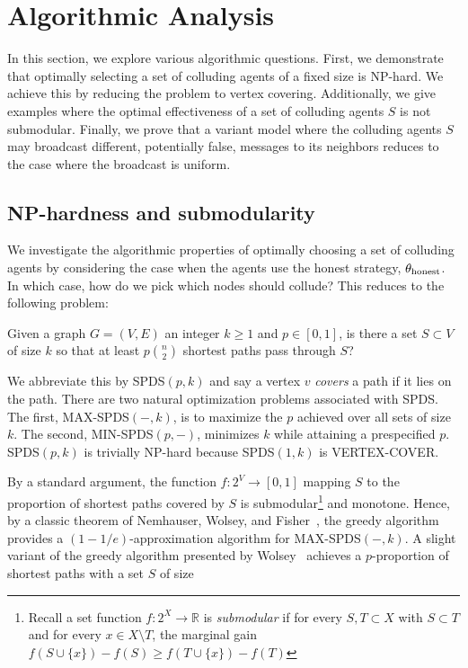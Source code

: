 \documentclass{comnet}
\begin{document}
\section{Algorithmic Analysis}

In this section, we explore various algorithmic questions. First, we demonstrate that optimally selecting a set of colluding agents of a fixed size is NP-hard. We achieve this by reducing the problem to vertex covering. Additionally, we give examples where the optimal effectiveness of a set of colluding agents $S$ is not submodular. Finally, we prove that a variant model where the colluding agents $S$ may broadcast different, potentially false, messages to its neighbors reduces to the case where the broadcast is uniform.

\subsection{NP-hardness and submodularity} \label{sec:combinatorial}

We investigate the algorithmic properties of optimally choosing a set of colluding
agents by considering the case when the agents use the honest strategy, $\theta_{\textup{honest}}$. In which case, how do we pick which nodes should collude? This reduces to the following problem:

\begin{problem} \label{prob:spds}
Given a graph $G = (V,E)$ an integer $k \geq 1$ and $p \in [0,1]$, is there a
set $S \subset V$ of size $k$ so that at least $p \binom{n}{2}$ shortest paths
pass through $S$?
\end{problem}

We abbreviate this by SPDS$(p,k)$ and say a vertex $v$ \emph{covers} a path if
it lies on the path. There are two natural optimization problems associated
with SPDS. The first, MAX-SPDS$(-,k)$, is to maximize the $p$ achieved over all
sets of size $k$. The second, MIN-SPDS$(p,-)$, minimizes $k$ while attaining a
prespecified $p$. SPDS$(p,k)$ is trivially NP-hard because SPDS$(1, k)$ is
VERTEX-COVER.
 
By a standard argument, the function $f: 2^V \to [0,1]$ mapping $S$ to the
proportion of shortest paths covered by $S$ is submodular\footnote{Recall a set
function $f:2^X \to \mathbb{R}$ is \emph{submodular} if for every $S, T \subset
X$ with $S \subset T$ and for every $x \in X \setminus T$, the marginal gain
$f(S \cup \{ x \}) - f(S) \geq f(T \cup \{ x \}) - f(T)$} and monotone.  Hence,
by a classic theorem of Nemhauser, Wolsey, and Fisher~\cite{NemhauserWF78}, the
greedy algorithm provides a $(1-1/e)$-approximation algorithm for
MAX-SPDS$(-,k)$. A slight variant of the greedy algorithm presented by
Wolsey~\cite{Wolsey82} achieves a $p$-proportion of shortest paths with a set
$S$ of size
\end{document}

